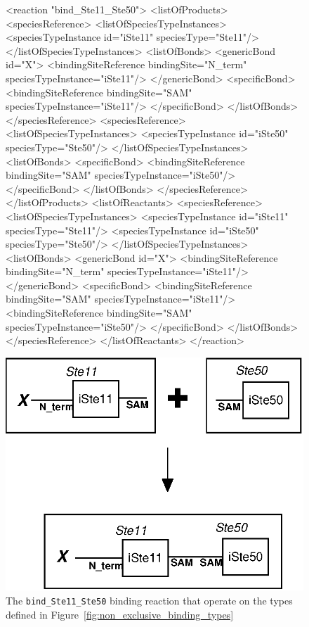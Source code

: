 \documentclass{cekarticle}
\begin{document}
\begin{figure}[h]
\begin{example}
<reaction "bind_Ste11_Ste50">
    <listOfProducts>
        <speciesReference>
            <listOfSpeciesTypeInstances>
                <speciesTypeInstance id="iSte11" speciesType="Ste11"/>
            </listOfSpeciesTypeInstances>
            <listOfBonds>
                <genericBond id="X">
                    <bindingSiteReference bindingSite="N_term" speciesTypeInstance="iSte11"/>
                </genericBond>
                <specificBond>
                    <bindingSiteReference bindingSite="SAM" speciesTypeInstance="iSte11"/>
                </specificBond>
            </listOfBonds>
        </speciesReference>
        <speciesReference>
            <listOfSpeciesTypeInstances>
                <speciesTypeInstance id="iSte50" speciesType="Ste50"/>
            </listOfSpeciesTypeInstances>
            <listOfBonds>
                <specificBond>
                    <bindingSiteReference bindingSite="SAM" speciesTypeInstance="iSte50"/>
                </specificBond>
            </listOfBonds>
        </speciesReference>
    </listOfProducts>
    <listOfReactants>
        <speciesReference>
            <listOfSpeciesTypeInstances>
                <speciesTypeInstance id="iSte11" speciesType="Ste11"/>
                <speciesTypeInstance id="iSte50" speciesType="Ste50"/>
            </listOfSpeciesTypeInstances>
            <listOfBonds>
                <genericBond id="X">
                    <bindingSiteReference bindingSite="N_term" speciesTypeInstance="iSte11"/>
                </genericBond>
                <specificBond>
                    <bindingSiteReference bindingSite="SAM" speciesTypeInstance="iSte11"/>
                    <bindingSiteReference bindingSite="SAM" speciesTypeInstance="iSte50"/>
                </specificBond>
            </listOfBonds>
        </speciesReference>
    </listOfReactants>
</reaction>
\end{example}
  \vspace*{8pt}
  \centering
  \includegraphics[scale = 0.7]{bind_Ste11_Ste50.eps}
  \caption{The \texttt{bind\_Ste11\_Ste50} binding reaction that operate on the types defined in
  Figure~\ref{fig:non_exclusive_binding_types}}
  \label{fig:bind_Ste11_Ste50}
\end{figure}
\end{document}
